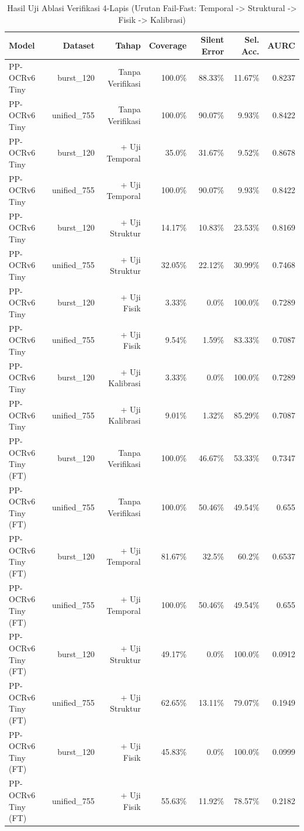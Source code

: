\begin{table}[htbp]
\centering
\caption{Hasil Uji Ablasi Verifikasi 4-Lapis (Urutan Fail-Fast: Temporal -> Struktural -> Fisik -> Kalibrasi)}
\label{tab:tahap_b_ablasi}
\begin{tabular}{lrrrrrr}
\hline
Model & Dataset & Tahap & Coverage & Silent Error & Sel. Acc. & AURC \\
\hline
PP-OCRv6 Tiny & burst\_120 & Tanpa Verifikasi & 100.0\% & 88.33\% & 11.67\% & 0.8237 \\
PP-OCRv6 Tiny & unified\_755 & Tanpa Verifikasi & 100.0\% & 90.07\% & 9.93\% & 0.8422 \\
PP-OCRv6 Tiny & burst\_120 & + Uji Temporal & 35.0\% & 31.67\% & 9.52\% & 0.8678 \\
PP-OCRv6 Tiny & unified\_755 & + Uji Temporal & 100.0\% & 90.07\% & 9.93\% & 0.8422 \\
PP-OCRv6 Tiny & burst\_120 & + Uji Struktur & 14.17\% & 10.83\% & 23.53\% & 0.8169 \\
PP-OCRv6 Tiny & unified\_755 & + Uji Struktur & 32.05\% & 22.12\% & 30.99\% & 0.7468 \\
PP-OCRv6 Tiny & burst\_120 & + Uji Fisik & 3.33\% & 0.0\% & 100.0\% & 0.7289 \\
PP-OCRv6 Tiny & unified\_755 & + Uji Fisik & 9.54\% & 1.59\% & 83.33\% & 0.7087 \\
PP-OCRv6 Tiny & burst\_120 & + Uji Kalibrasi & 3.33\% & 0.0\% & 100.0\% & 0.7289 \\
PP-OCRv6 Tiny & unified\_755 & + Uji Kalibrasi & 9.01\% & 1.32\% & 85.29\% & 0.7087 \\
PP-OCRv6 Tiny (FT) & burst\_120 & Tanpa Verifikasi & 100.0\% & 46.67\% & 53.33\% & 0.7347 \\
PP-OCRv6 Tiny (FT) & unified\_755 & Tanpa Verifikasi & 100.0\% & 50.46\% & 49.54\% & 0.655 \\
PP-OCRv6 Tiny (FT) & burst\_120 & + Uji Temporal & 81.67\% & 32.5\% & 60.2\% & 0.6537 \\
PP-OCRv6 Tiny (FT) & unified\_755 & + Uji Temporal & 100.0\% & 50.46\% & 49.54\% & 0.655 \\
PP-OCRv6 Tiny (FT) & burst\_120 & + Uji Struktur & 49.17\% & 0.0\% & 100.0\% & 0.0912 \\
PP-OCRv6 Tiny (FT) & unified\_755 & + Uji Struktur & 62.65\% & 13.11\% & 79.07\% & 0.1949 \\
PP-OCRv6 Tiny (FT) & burst\_120 & + Uji Fisik & 45.83\% & 0.0\% & 100.0\% & 0.0999 \\
PP-OCRv6 Tiny (FT) & unified\_755 & + Uji Fisik & 55.63\% & 11.92\% & 78.57\% & 0.2182 \\

\end{tabular}
\end{table}
